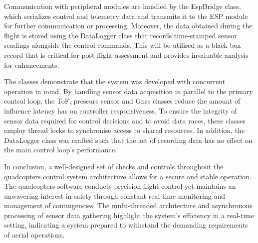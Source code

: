 \documentclass{report}
\begin{document}
Communication with peripheral modules are handled by the EspBridge class, which
serializes control and telemetry data and transmits it to the ESP module for
further communication or processing. Moreover, the data obtained during the
flight is stored using the DataLogger class that records time-stamped sensor
readings alongside the control commands. This will be utilised as a black box
record that is critical for post-flight assessment and provides invaluable
analysis for enhancements.

The classes demonstrate that the system was developed with concurrent operation
in mind. By handling sensor data acquisition in parallel to the primary control
loop, the ToF, pressure sensor and Gnss classes reduce the amount of influence
latency has on controller responsiveness. To ensure the integrity of sensor data
required for control decisions and to avoid data races, these classes employ
thread locks to synchronise access to shared resources. In addition, the
DataLogger class was crafted such that the act of recording data has no effect
on the main control loop's performance.

In conclusion, a well-designed set of checks and controls throughout the
quadcopters control system architecture allows for a secure and stable
operation. The quadcopters software conducts precision flight control yet
maintains an unwavering interest in safety through constant real-time monitoring
and management of contingencies. The multi-threaded architecture and
asynchronous processing of sensor data gathering highlight the system's
efficiency in a real-time setting, indicating a system prepared to withstand the
demanding requirements of aerial operations.
\end{document}
